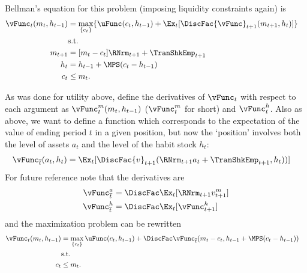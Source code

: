 \documentclass[titlepage, headings=optiontotocandhead]{\econtex}
\begin{document}
{  Bellman's equation for this problem (imposing liquidity constraints again) is
  \begin{equation}\begin{gathered}\begin{aligned}
        {\vFunc}_{t}({m}_{t},h_{t-1})  & = \max_{\{{c}_{t}\}}  \{\uFunc({c}_{t},h_{t-1}) +
        \Ex_{t}[\DiscFac  {\vFunc}_{t+1}({m}_{t+1},h_{t}) ]\}
        \\ & \text{s.t.} & \nonumber \\
        {m}_{t+1}  & = [{m}_{t}-{c}_{t}]\RNrm_{t+1} + \TranShkEmp_{t+1}\\
        h_{t}  & = h_{t-1} + \MPS ({c}_{t} - h_{t-1} ) \\
        {c}_{t} & \leq  {m}_{t} .
      \end{aligned}\end{gathered}\end{equation}

  As was done for utility above, define the derivatives of ${\vFunc}_{t}$ with
  respect to each argument as ${\vFunc}_{t}^{m}({m}_{t},h_{t-1})$ (${\vFunc}_{t}^{m}$
  for short) and ${\vFunc}_{t}^{h}$.  Also as above, we want to
  define a function which corresponds to the expectation of the value of
  ending period $t$ in a given position, but now the `position'
  involves both the level of assets ${a}_{t}$ and the level of the habit
  stock $h_{t}$:
  \begin{equation}\begin{gathered}\begin{aligned}
        \vEOPt({a}_{t},h_{t})  & = \Ex_{t}[\DiscFac {v}_{t+1}(\RNrm_{t+1} {a}_{t}+{\TranShkEmp}_{t+1},h_{t}))]
      \end{aligned}\end{gathered}\end{equation}
  For future reference note that the derivatives are
  \begin{equation}\begin{gathered}\begin{aligned}
        \vEOPt^{{a}}  & = \DiscFac \Ex_{t} [\RNrm_{t+1} {v}_{t+1}^{m}] \label{eq:vEndsdefn} \\
        \vEOPt^{h}  & = \DiscFac \Ex_{t} [{\vFunc}_{t+1}^{h}] \label{eq:vEndhdefn}
      \end{aligned}\end{gathered}\end{equation}
  and the maximization problem can be rewritten
  \begin{equation}\begin{gathered}\begin{aligned}
        {\vFunc}_{t}({m}_{t},h_{t-1}) 
        & =                                         \max_{\{{c}_{t}\}} %
        \uFunc({c}_{t},h_{t-1})  +  \DiscFac
        \vEOPt({m}_{t}-{c}_{t},h_{t-1}+\MPS({c}_{t}-h_{t-1}))
        \\        & \text{s.t.} & \nonumber
        \\  {c}_{t} & \leq  {m}_{t}.
      \end{aligned}\end{gathered}\end{equation}

}
\end{document}
